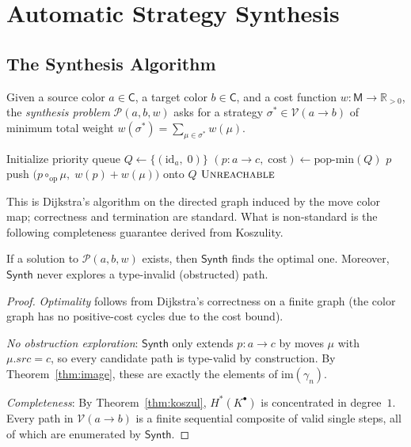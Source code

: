 \documentclass[11pt]{article}
\newcommand{\Vop}{\mathcal{V}}           %
\newcommand{\GrColor}{\mathsf{C}}        %
\newcommand{\Kcom}{K^{\bullet}}          %
\newcommand{\opcomp}{\circ_{\mathrm{op}}}%
\newcommand{\strat}{\sigma}              %
\newcommand{\MoveAlph}{\mathsf{M}}       %
\newcommand{\synthAlg}{\mathsf{Synth}}  %
\newcommand{\im}{\mathrm{im}}            %
\begin{document}
\section{Automatic Strategy Synthesis}\label{sec:synthesis}

\subsection{The Synthesis Algorithm}

\begin{definition}\label{def:synthprob}
Given a source color $a \in \GrColor$, a target color $b \in \GrColor$,
and a cost function $w : \MoveAlph \to \mathbb{R}_{>0}$, the
\emph{synthesis problem} $\mathcal{P}(a,b,w)$ asks for a strategy
$\strat^* \in \Vop(a \to b)$ of minimum total weight
$w(\strat^*) = \sum_{\mu \in \strat^*} w(\mu)$.
\end{definition}

\begin{algorithm}[ht]
\caption{$\synthAlg(a, b, w)$ --- optimal strategy synthesis}
\label{alg:synth}
\begin{algorithmic}[1]
\STATE Initialize priority queue
  $Q \leftarrow \{(\mathrm{id}_a,\;0)\}$
  \STATE $(p : a \to c,\;\mathrm{cost}) \leftarrow \mathrm{pop\text{-}min}(Q)$
    \RETURN $p$
  \ENDIF
    \STATE push $\bigl(p \opcomp \mu,\; w(p)+w(\mu)\bigr)$ onto $Q$
  \ENDFOR
\ENDWHILE
\RETURN $\textsc{Unreachable}$
\end{algorithmic}
\end{algorithm}

This is Dijkstra's algorithm on the directed graph induced by the move
color map; correctness and termination are standard.
What is non-standard is the following completeness guarantee derived
from Koszulity.

\begin{theorem}\label{thm:completeness}
If a solution to $\mathcal{P}(a,b,w)$ exists, then $\synthAlg$ finds
the optimal one.  Moreover, $\synthAlg$ never explores a type-invalid
(obstructed) path.
\end{theorem}

\begin{proof}
\emph{Optimality} follows from Dijkstra's correctness on a finite graph
(the color graph has no positive-cost cycles due to the cost bound).

\emph{No obstruction exploration}: $\synthAlg$ only extends $p : a \to c$
by moves $\mu$ with $\mu.\mathit{src} = c$, so every candidate path is
type-valid by construction.  By Theorem~\ref{thm:image}, these are
exactly the elements of $\im(\gamma_n)$.

\emph{Completeness}: By Theorem~\ref{thm:koszul}, $H^*(\Kcom)$ is
concentrated in degree~$1$.  Every path in $\Vop(a \to b)$ is a finite
sequential composite of valid single steps, all of which are enumerated
by $\synthAlg$.
\end{proof}
\end{document}
